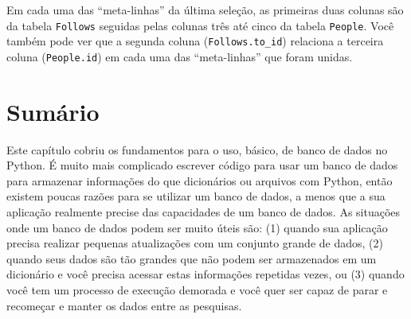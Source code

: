 

Em cada uma das ``meta-linhas'' da última seleção, as primeiras duas colunas
são da tabela {\tt Follows} seguidas pelas colunas três até cinco da tabela
{\tt People}. Você também pode ver que a segunda coluna (\verb"Follows.to_id")
relaciona a terceira coluna ({\tt People.id}) em cada uma das ``meta-linhas''
que foram unidas.

\section{Sumário}


Este capítulo cobriu os fundamentos para o uso, básico, de banco de dados no
Python. É muito mais complicado escrever código para usar um banco de dados
para armazenar informações do que dicionários ou arquivos com Python, então
existem poucas razões para se utilizar um banco de dados, a menos que a sua
aplicação realmente precise das capacidades de um banco de dados. As situações
onde um banco de dados podem ser muito úteis são: (1) quando sua aplicação
precisa realizar pequenas atualizações com um conjunto grande de dados, (2)
quando seus dados são tão grandes que não podem ser armazenados em um
dicionário e você precisa acessar estas informações repetidas vezes, ou (3)
quando você tem um processo de execução demorada e você quer ser capaz de
parar e recomeçar e manter os dados entre as pesquisas.

